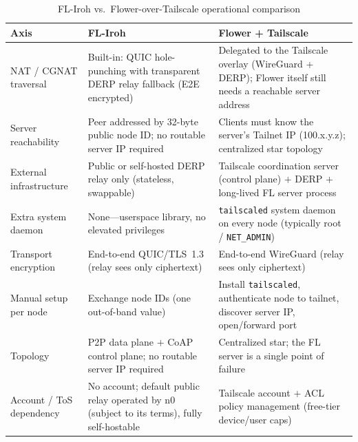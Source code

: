﻿\documentclass[journal]{IEEEtran}
\begin{document}
\begin{table}[t]
\centering
\caption{FL-Iroh vs.\ Flower-over-Tailscale operational comparison}
\label{tab:e7}
\footnotesize
\renewcommand{\arraystretch}{1.25}
\begin{tabular}{p{2.5cm} p{6.3cm} p{6.3cm}}
\toprule
\textbf{Axis} & \textbf{FL-Iroh} & \textbf{Flower + Tailscale} \\
\midrule
NAT / CGNAT traversal & Built-in: QUIC hole-punching with transparent DERP relay fallback (E2E encrypted) & Delegated to the Tailscale overlay (WireGuard + DERP); Flower itself still needs a reachable server address \\
Server reachability & Peer addressed by 32-byte public node ID; no routable server IP required & Clients must know the server's Tailnet IP (100.x.y.z); centralized star topology \\
External infrastructure & Public or self-hosted DERP relay only (stateless, swappable) & Tailscale coordination server (control plane) $+$ DERP $+$ long-lived FL server process \\
Extra system daemon & None---userspace library, no elevated privileges & \texttt{tailscaled} system daemon on every node (typically root / \texttt{NET\_ADMIN}) \\
Transport encryption & End-to-end QUIC/TLS~1.3 (relay sees only ciphertext) & End-to-end WireGuard (relay sees only ciphertext) \\
Manual setup per node & Exchange node IDs (one out-of-band value) & Install \texttt{tailscaled}, authenticate node to tailnet, discover server IP, open/forward port \\
Topology & P2P data plane $+$ CoAP control plane; no routable server IP required & Centralized star; the FL server is a single point of failure \\
Account / ToS dependency & No account; default public relay operated by n0 (subject to its terms), fully self-hostable & Tailscale account $+$ ACL policy management (free-tier device/user caps) \\
\bottomrule
\end{tabular}
\end{table}
\end{document}
